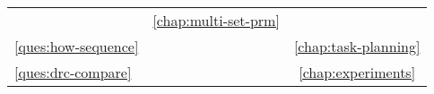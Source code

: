 \begin{center}
\begin{tabular}{llc}
\begin{minipage}[c]{0.75\columnwidth}
      \nameref{ques:multi-set-suited}
      \end{minipage}%
      & \ref{chap:multi-set-prm} \\[12pt]
   \ref{ques:how-sequence}
      &
      \begin{minipage}[c]{0.75\columnwidth}%
      \nameref{ques:how-sequence}
      \end{minipage}%
      & \ref{chap:task-planning} \\[12pt]
   \ref{ques:drc-compare}
      &
      \begin{minipage}[c]{0.75\columnwidth}%
      \nameref{ques:drc-compare}
      \end{minipage}%
      & \ref{chap:experiments} \\[12pt]
\bottomrule
\end{tabular}
\end{center}

